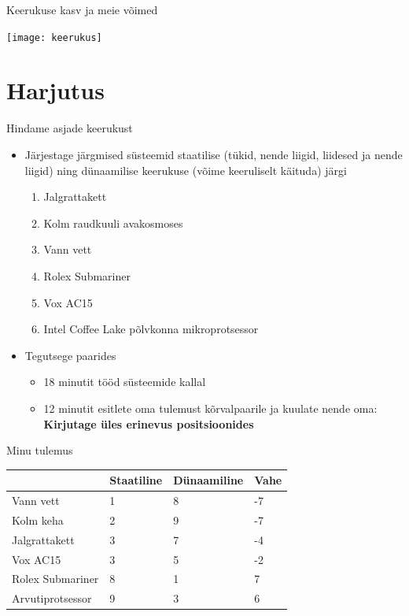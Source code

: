 \documentclass{beamer}
\begin{document}
{
\begin{frame}[plain]
\end{frame}
}

\begin{frame}{Keerukuse kasv ja meie võimed}
	\begin{center}
		\texttt{[image: keerukus]}
	\end{center}
\end{frame}


\section{Harjutus}
\begin{frame}{Hindame asjade keerukust}

	\begin{itemize}
		\item Järjestage järgmised süsteemid staatilise (tükid, nende liigid, liidesed ja nende liigid) ning dünaamilise keerukuse (võime keeruliselt käituda) järgi
		\begin{enumerate}
			\item Jalgrattakett
			\item Kolm raudkuuli avakosmoses
			\item Vann vett
			\item Rolex Submariner
			\item Vox AC15
			\item Intel Coffee Lake põlvkonna mikroprotsessor
		\end{enumerate}
		\item Tegutsege paarides
		\begin{itemize}
			\item 18 minutit tööd süsteemide kallal
			\item 12 minutit esitlete oma tulemust kõrvalpaarile ja kuulate nende oma: \textbf{Kirjutage üles erinevus positsioonides}
		\end{itemize}
	\end{itemize}
\end{frame}

\begin{frame}{Minu tulemus}
\begin{table}[]
\centering
\begin{tabular}{l|l|l|l}
 & \textbf{Staatiline} & \textbf{Dünaamiline} & \textbf{Vahe} \\ \hline
Vann  vett & 1 & 8 & -7 \\
Kolm keha & 2 & 9 & -7 \\
Jalgrattakett & 3 & 7 & -4 \\
Vox AC15 & 3 & 5 & -2 \\
Rolex Submariner & 8 & 1 & 7 \\
Arvutiprotsessor & 9 & 3 & 6
\end{tabular}
\end{table}
\end{frame}
\end{document}
